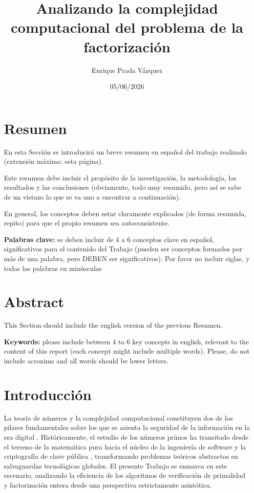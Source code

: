 \documentclass[11pt,a4paper,spanish]{book}
\title{Analizando la complejidad computacional del problema de la factorización}
\author{Enrique Prada Vázquez}
\date{05/06/2026}
\begin{document}
\renewcommand{\listfigurename}{Índice de figuras}
\renewcommand{\listtablename}{Índice de tablas}
\renewcommand{\contentsname}{Índice de contenidos}
\renewcommand{\figurename}{Figura}
\renewcommand{\tablename}{Tabla} 

\maketitle
\frontmatter
\tableofcontents

\chapter{Resumen}
En esta Sección se introducirá un breve resumen en español del trabajo realizado (extensión máxima: esta página). 

Este resumen debe incluir el propósito de la investigación, la metodología, los resultados y las conclusiones (obviamente, todo muy resumido, pero así se sabe de un vistazo lo que se va uno a encontrar a continuación). 

En general, los conceptos deben estar claramente explicados (de forma resumida, repito) para que el propio resumen sea autoconsistente.

\vspace{0.5cm}
{\bf Palabras clave:} se deben incluir de 4 a 6 conceptos clave en español, significativos para el contenido del Trabajo (pueden ser conceptos formados por más de una palabra, pero DEBEN ser significativos). Por favor no incluir siglas, y todas las palabras en minúsculas

\chapter{Abstract}
This Section should include the english version of the previous Resumen.

\vspace{0.5cm}
{\bf Keywords:} please include between 4 to 6 key concepts in english, relevant to the content of this report (each concept might include multiple words). Please, do not include acronims and all words should be lower letters.

\mainmatter

\chapter{Introducción}

La teoría de números y la complejidad computacional constituyen dos de los pilares fundamentales sobre los que se asienta la seguridad de la información en la era digital \citep{koblitz1994}. Históricamente, el estudio de los números primos ha transitado desde el terreno de la matemática pura hacia el núcleo de la ingeniería de software y la criptografía de clave pública \citep{hardy1979}, transformando problemas teóricos abstractos en salvaguardas tecnológicas globales. El presente Trabajo se enmarca en este escenario, analizando la eficiencia de los algoritmos de verificación de primalidad y factorización entera desde una perspectiva estrictamente asintótica.
\end{document}
